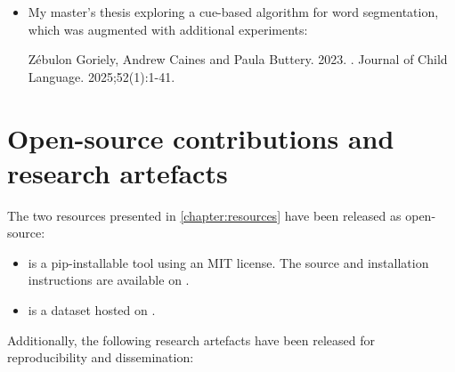 \begin{itemize}
\item My master's thesis exploring a cue-based algorithm for word segmentation, which was augmented with additional experiments:
\begin{mdframed}[linewidth=1pt]
    Z\'ebulon Goriely, Andrew Caines and Paula Buttery. 2023. \href{https://www.cambridge.org/core/journals/journal-of-child-language/article/word-segmentation-from-transcriptions-of-childdirected-speech-using-lexical-and-sublexical-cues/5D206536C878ADA80026ED8E2E72F848}{}. Journal of Child Language. 2025;52(1):1-41.
\end{mdframed}
\end{itemize}

\section{Open-source contributions and research artefacts}

The two resources presented in \cref{chapter:resources} have been released as open-source:

\begin{itemize}
\item \gpp is a pip-installable tool using an MIT license. The source and installation instructions are available on \href{https://github.com/codebyzeb/g2p-plus}{}. 
\item \ipachildes is a dataset hosted on \href{https://huggingface.co/datasets/phonemetransformers/IPA-CHILDES}{}.
\end{itemize}

Additionally, the following research artefacts have been released for reproducibility and dissemination:

